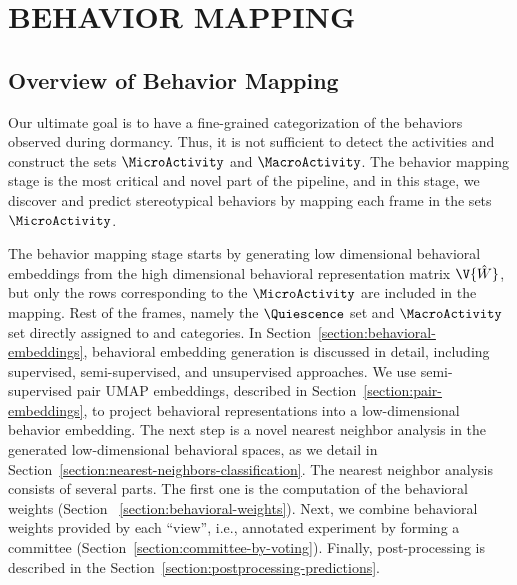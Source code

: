 \setlength{\parindent}{0pt}
\chapter{\bf BEHAVIOR MAPPING}\label{chapter:behavior-mapping}
\section{Overview of Behavior Mapping}
Our ultimate goal is to have a fine-grained categorization of the behaviors observed during dormancy. Thus, it is not sufficient to detect the activities and construct the sets $\MicroActivity$ and $\MacroActivity$. The behavior mapping stage is the most critical and novel part of the pipeline, and in this stage, we discover and predict stereotypical behaviors by mapping each frame in the sets $\MicroActivity$.

The behavior mapping stage starts by generating low dimensional behavioral embeddings from the high dimensional behavioral representation matrix $\V{\hat{W}}$, but only the rows corresponding to the $\MicroActivity$ are included in the mapping.
Rest of the frames, namely the $\Quiescence$ set and $\MacroActivity$ set directly assigned to \QuiescentOther and \Moving categories.
In Section~\ref{section:behavioral-embeddings}, behavioral embedding generation is discussed in detail, including supervised, semi-supervised, and unsupervised approaches.
We use semi-supervised pair UMAP embeddings, described in Section~\ref{section:pair-embeddings}, to project behavioral representations into a low-dimensional behavior embedding.
The next step is a novel nearest neighbor analysis in the generated low-dimensional behavioral spaces, as we detail in Section~\ref{section:nearest-neighbors-classification}.
The nearest neighbor analysis consists of several parts.
The first one is the computation of the behavioral weights (Section ~\ref{section:behavioral-weights}).
Next, we combine behavioral weights provided by each ``view'', i.e., annotated experiment by forming a committee (Section~\ref{section:committee-by-voting}).
Finally, post-processing is described in the Section~\ref{section:postprocessing-predictions}.

